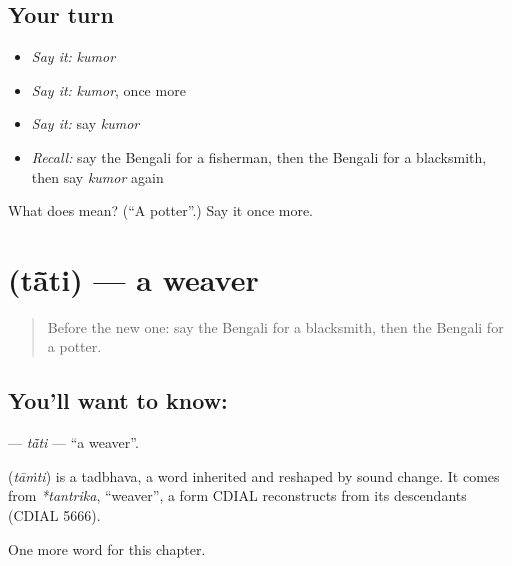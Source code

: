 \subsection*{Your turn}
\begin{itemize}
\raggedright
  \item \emph{Say it:} \emph{kumor}
  \item \emph{Say it:} \emph{kumor}, once more
  \item \emph{Say it:} say \emph{kumor}
  \item \emph{Recall:} say the Bengali for a fisherman, then the Bengali for a blacksmith, then say \emph{kumor} again
\end{itemize}

\begin{tcolorbox}[breakable,colback=teal!4,colframe=teal!35!black,title={Before you move on}]
What does  mean? (\textquotedblleft{}A potter\textquotedblright{}.) Say it once more.
\end{tcolorbox}
\section[\texorpdfstring{\bn{তাঁতি} (tā̃ti)}{তাঁতি (tā̃ti)}]{ (tā̃ti) — a weaver}

\label{lesson:BN-C125-tati}



\begin{quote}
Before the new one: say the Bengali for a blacksmith, then the Bengali for a potter.
\end{quote}

\subsection*{You'll want to know: }
\textbf{} — \emph{tā̃ti} — \textquotedblleft{}a weaver\textquotedblright{}.

\begin{cousinweb}
\textbf{} (\emph{tāṁti}) is a tadbhava, a word inherited and reshaped by sound change. It comes from \emph{*tantrika}, \textquotedblleft{}weaver\textquotedblright{}, a form CDIAL reconstructs from its descendants (CDIAL 5666).
\end{cousinweb}

\begin{grammarlens}[title={What you've built}]
One more word for this chapter.
\end{grammarlens}

